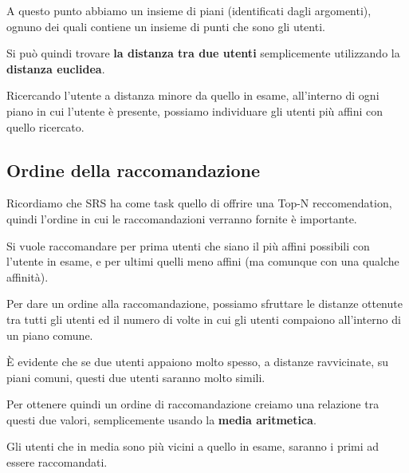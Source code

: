 {A questo punto abbiamo un insieme di piani (identificati dagli argomenti), ognuno dei quali contiene un insieme di punti che sono gli utenti.

Si può quindi trovare \textbf{la distanza tra due utenti} semplicemente utilizzando la \textbf{distanza euclidea}.

Ricercando l'utente a distanza minore da quello in esame, all'interno di ogni piano in cui l'utente è presente, possiamo individuare gli utenti più affini con quello ricercato.
\clearpage
\subsection{Ordine della raccomandazione}

Ricordiamo che SRS ha come task quello di offrire una Top-N reccomendation, quindi l'ordine in cui le raccomandazioni verranno fornite è importante.

Si vuole raccomandare per prima utenti che siano il più affini possibili con l'utente in esame, e per ultimi quelli meno affini (ma comunque con una qualche affinità).

Per dare un ordine alla raccomandazione, possiamo sfruttare le distanze ottenute tra tutti gli utenti ed il numero di volte in cui gli utenti compaiono all'interno di un piano comune.

È evidente che se due utenti appaiono molto spesso, a distanze ravvicinate, su piani comuni, questi due utenti saranno molto simili.

Per ottenere quindi un ordine di raccomandazione creiamo una relazione tra questi due valori, semplicemente usando la \textbf{media aritmetica}.

Gli utenti che in media sono più vicini a quello in esame, saranno i primi ad essere raccomandati.

\clearpage
}
